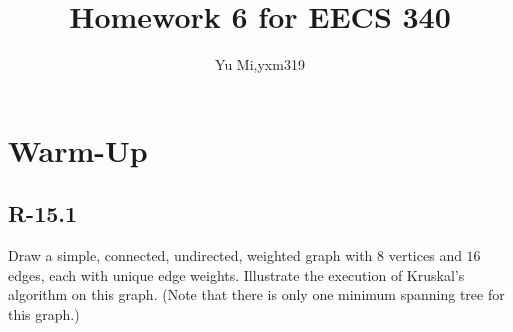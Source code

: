 \documentclass[11pt]{article}
\begin{document}
	\title{Homework 6 for EECS 340}
	\author{Yu Mi,yxm319}
	\maketitle
\section{Warm-Up}
\subsection{R-15.1}
Draw a simple, connected, undirected, weighted graph with $8$ vertices and $16$ edges, each with unique edge weights. Illustrate the execution of Kruskal’s algorithm on this graph. (Note that there is only one minimum spanning tree for this graph.)
\end{document}
